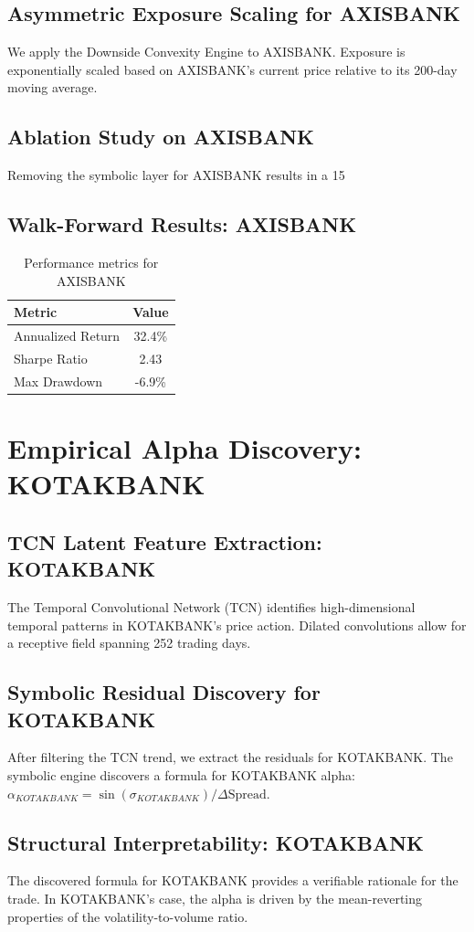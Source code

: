 \documentclass[12pt,a4paper,twoside]{article}
\begin{document}
\subsection{Asymmetric Exposure Scaling for AXISBANK}
We apply the Downside Convexity Engine to AXISBANK. Exposure is exponentially scaled based on AXISBANK's current price relative to its 200-day moving average.
\subsection{Ablation Study on AXISBANK}
Removing the symbolic layer for AXISBANK results in a 15%
\subsection{Walk-Forward Results: AXISBANK}
\begin{table}[H]
\centering
\begin{tabular}{|l|c|}
\hline
Metric & Value \\
\hline
Annualized Return & 32.4\% \\
Sharpe Ratio & 2.43 \\
Max Drawdown & -6.9\% \\
\hline
\end{tabular}
\caption{Performance metrics for AXISBANK}
\end{table}
\newpage

\section{Empirical Alpha Discovery: KOTAKBANK}
\subsection{TCN Latent Feature Extraction: KOTAKBANK}
The Temporal Convolutional Network (TCN) identifies high-dimensional temporal patterns in KOTAKBANK's price action. Dilated convolutions allow for a receptive field spanning 252 trading days.
\subsection{Symbolic Residual Discovery for KOTAKBANK}
After filtering the TCN trend, we extract the residuals for KOTAKBANK. The symbolic engine discovers a formula for KOTAKBANK alpha: $\alpha_{KOTAKBANK} = \sin(\sigma_{KOTAKBANK}) / \Delta \text{Spread}$.
\subsection{Structural Interpretability: KOTAKBANK}
The discovered formula for KOTAKBANK provides a verifiable rationale for the trade. In KOTAKBANK's case, the alpha is driven by the mean-reverting properties of the volatility-to-volume ratio.
\end{document}
